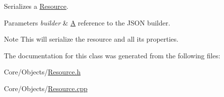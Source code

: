 Serializes a \hyperlink{classDCEngine_1_1Resource}{Resource}. 


\begin{DoxyParams}{Parameters}
{\em builder} & \hyperlink{classA}{A} reference to the J\-S\-O\-N builder. \\
\hline
\end{DoxyParams}
\begin{DoxyNote}{Note}
This will serialize the resource and all its properties. 
\end{DoxyNote}


The documentation for this class was generated from the following files\-:\begin{DoxyCompactItemize}
\item 
Core/\-Objects/\hyperlink{Resource_8h}{Resource.\-h}\item 
Core/\-Objects/\hyperlink{Resource_8cpp}{Resource.\-cpp}\end{DoxyCompactItemize}
